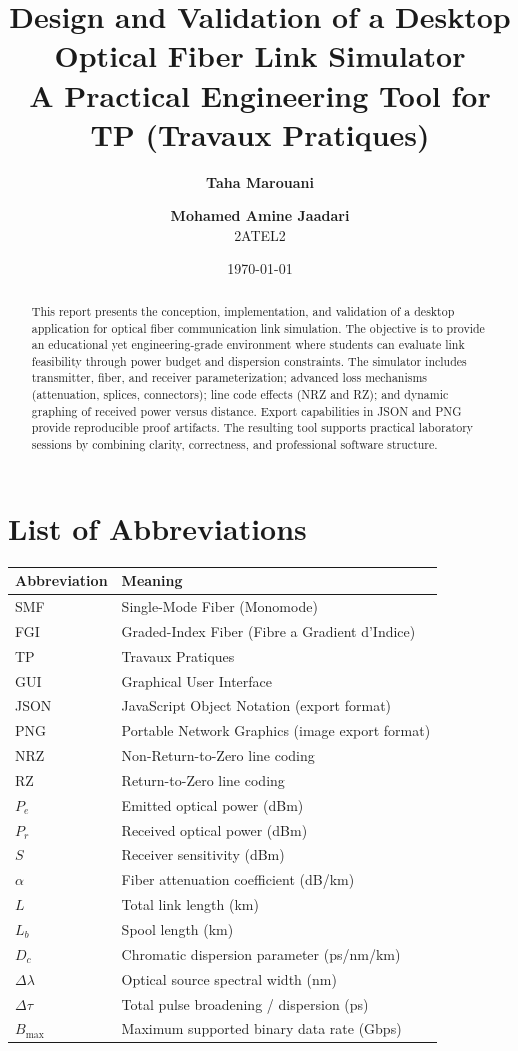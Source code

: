 \documentclass[11pt,a4paper]{article}
\title{
  \vspace{-1.2cm}
  \textbf{Design and Validation of a Desktop Optical Fiber Link Simulator}\\
  \large A Practical Engineering Tool for TP (Travaux Pratiques)
}
\author{
  \textbf{Taha Marouani} \and \textbf{Mohamed Amine Jaadari}\\
  2ATEL2
}
\date{\today}
\begin{document}
\maketitle
\thispagestyle{fancy}

\begin{abstract}
This report presents the conception, implementation, and validation of a desktop application for optical fiber communication link simulation. The objective is to provide an educational yet engineering-grade environment where students can evaluate link feasibility through power budget and dispersion constraints. The simulator includes transmitter, fiber, and receiver parameterization; advanced loss mechanisms (attenuation, splices, connectors); line code effects (NRZ and RZ); and dynamic graphing of received power versus distance. Export capabilities in JSON and PNG provide reproducible proof artifacts. The resulting tool supports practical laboratory sessions by combining clarity, correctness, and professional software structure.
\end{abstract}

\tableofcontents
\newpage

\section*{List of Abbreviations}
\begin{longtable}{p{}p{}}
\toprule
\textbf{Abbreviation} & \textbf{Meaning} \\
\midrule
SMF & Single-Mode Fiber (Monomode) \\
FGI & Graded-Index Fiber (Fibre a Gradient d'Indice) \\
TP & Travaux Pratiques \\
GUI & Graphical User Interface \\
JSON & JavaScript Object Notation (export format) \\
PNG & Portable Network Graphics (image export format) \\
NRZ & Non-Return-to-Zero line coding \\
RZ & Return-to-Zero line coding \\
$P_e$ & Emitted optical power (dBm) \\
$P_r$ & Received optical power (dBm) \\
$S$ & Receiver sensitivity (dBm) \\
$\alpha$ & Fiber attenuation coefficient (dB/km) \\
$L$ & Total link length (km) \\
$L_b$ & Spool length (km) \\
$D_c$ & Chromatic dispersion parameter (ps/nm/km) \\
$\Delta \lambda$ & Optical source spectral width (nm) \\
$\Delta \tau$ & Total pulse broadening / dispersion (ps) \\
$B_{\max}$ & Maximum supported binary data rate (Gbps) \\
\bottomrule
\end{longtable}
\end{document}
